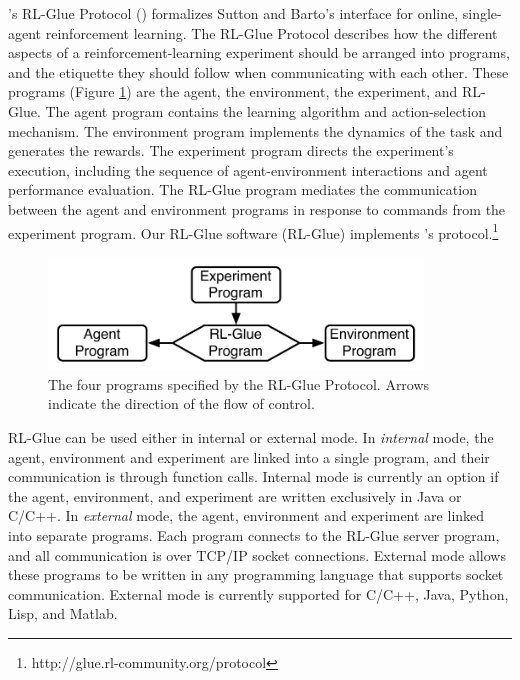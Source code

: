 \documentclass[twoside,11pt]{article}
\begin{document}
\citeauthor{whiteThesis}'s RL-Glue Protocol (\citeyear{whiteThesis}) formalizes Sutton and Barto's interface for online, single-agent reinforcement learning.  The RL-Glue Protocol describes how the different aspects of a reinforcement-learning experiment should be arranged into programs, and the etiquette they should follow when communicating with each other. These programs (Figure \ref{fig:RLDIA}) are the agent, the environment, the experiment, and RL-Glue.  The agent program contains the learning algorithm and action-selection mechanism. The environment program implements the dynamics of the task and generates the rewards. The experiment program directs the experiment's execution, including the sequence of agent-environment interactions and agent performance evaluation.  The RL-Glue program mediates the communication between the agent and environment programs in response to commands from the experiment program. Our RL-Glue software (RL-Glue) implements \citeauthor{whiteThesis}'s protocol.\footnote{http://glue.rl-community.org/protocol} 

\vspace{-0.4cm}
\begin{figure}[ht]
\begin{center}
\includegraphics[height=3cm]{figures/glue.pdf}
\vspace{-0.4cm}
\caption{\small The four programs specified by the RL-Glue Protocol.  Arrows indicate the direction of the flow of control.}
\label{fig:RLDIA}
\end{center}
\vspace{-0.7cm}
\end{figure}

 RL-Glue can be used either in  internal or external mode.  In \textit{internal} mode, the agent, environment and experiment are linked into a single program, and their communication is through function calls.  Internal mode is currently an option if the agent, environment, and experiment are written exclusively in Java or C/C++.  In  \textit{external} mode, the agent, environment and experiment are linked into separate programs.  Each program connects to the RL-Glue server program, and all communication is over TCP/IP socket connections. External mode allows these programs to be written in any programming language that supports socket communication.  External mode is currently supported for C/C++, Java, Python, Lisp, and Matlab.
\end{document}
